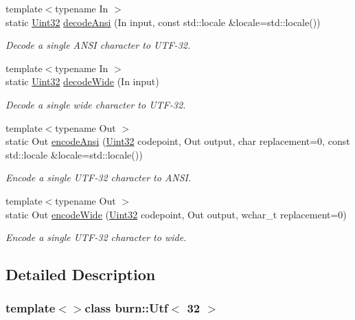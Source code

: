 \begin{DoxyCompactItemize}
{\footnotesize template$<$typename In $>$ }\\static \hyperlink{namespaceburn_ab40b09022209bd449d317c1f0e95356b}{Uint32} \hyperlink{classburn_1_1_utf_3_0132_01_4_ae01a71108463d355aba8f6090b49d4c3}{decode\-Ansi} (In input, const std\-::locale \&locale=std\-::locale())
\begin{DoxyCompactList}\small\item\em Decode a single A\-N\-S\-I character to U\-T\-F-\/32. \end{DoxyCompactList}\item 
{\footnotesize template$<$typename In $>$ }\\static \hyperlink{namespaceburn_ab40b09022209bd449d317c1f0e95356b}{Uint32} \hyperlink{classburn_1_1_utf_3_0132_01_4_a5fc906f33e02080ecf471ab4bca96556}{decode\-Wide} (In input)
\begin{DoxyCompactList}\small\item\em Decode a single wide character to U\-T\-F-\/32. \end{DoxyCompactList}\item 
{\footnotesize template$<$typename Out $>$ }\\static Out \hyperlink{classburn_1_1_utf_3_0132_01_4_a4ca4901d42db4706fe389f025ea9a9d5}{encode\-Ansi} (\hyperlink{namespaceburn_ab40b09022209bd449d317c1f0e95356b}{Uint32} codepoint, Out output, char replacement=0, const std\-::locale \&locale=std\-::locale())
\begin{DoxyCompactList}\small\item\em Encode a single U\-T\-F-\/32 character to A\-N\-S\-I. \end{DoxyCompactList}\item 
{\footnotesize template$<$typename Out $>$ }\\static Out \hyperlink{classburn_1_1_utf_3_0132_01_4_a9cfb1e768ebf03a4ed0fe4bd6028f7b1}{encode\-Wide} (\hyperlink{namespaceburn_ab40b09022209bd449d317c1f0e95356b}{Uint32} codepoint, Out output, wchar\-\_\-t replacement=0)
\begin{DoxyCompactList}\small\item\em Encode a single U\-T\-F-\/32 character to wide. \end{DoxyCompactList}\end{DoxyCompactItemize}


\subsection{Detailed Description}
\subsubsection*{template$<$$>$class burn\-::\-Utf$<$ 32 $>$}


